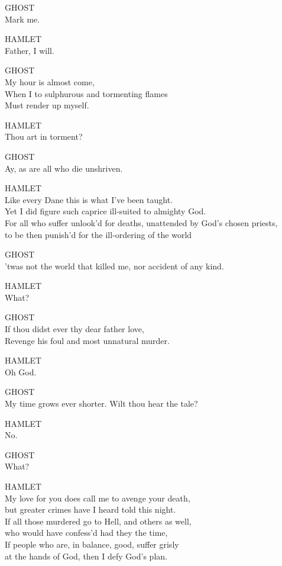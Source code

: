 \bigskip
\noindent{}GHOST\\
Mark me.

\bigskip
\noindent{}HAMLET\\
Father, I will.

\bigskip
\noindent{}GHOST\\
My hour is almost come,\\
When I to sulphurous and tormenting flames\\
Must render up myself.

\bigskip
\noindent{}HAMLET\\
Thou art in torment?

\bigskip
\noindent{}GHOST\\
Ay, as are all who die unshriven.

\bigskip
\noindent{}HAMLET\\
Like every Dane this is what I've been taught.\\
Yet I did figure such caprice ill-suited to almighty God.\\
For all who suffer unlook'd for deaths, unattended by God's chosen priests,\\
to be then punish'd for the ill-ordering of the world{\el}

\bigskip
\noindent{}GHOST\\
'twas not the world that killed me, nor accident of any kind.

\bigskip
\noindent{}HAMLET\\
What?

\bigskip
\noindent{}GHOST\\
If thou didst ever thy dear father love,\\
Revenge his foul and most unnatural murder.

\bigskip
\noindent{}HAMLET\\
Oh God.

\bigskip
\noindent{}GHOST\\
My time grows ever shorter. Wilt thou hear the tale?

\bigskip
\noindent{}HAMLET\\
No.

\bigskip
\noindent{}GHOST\\
What?

\bigskip
\noindent{}HAMLET\\
My love for you does call me to avenge your death,\\
but greater crimes have I heard told this night.\\
If all those murdered go to Hell, and others as well,\\
who would have confess'd had they the time,\\
If people who are, in balance, good, suffer grisly\\
at the hands of God, then I defy God's plan.

